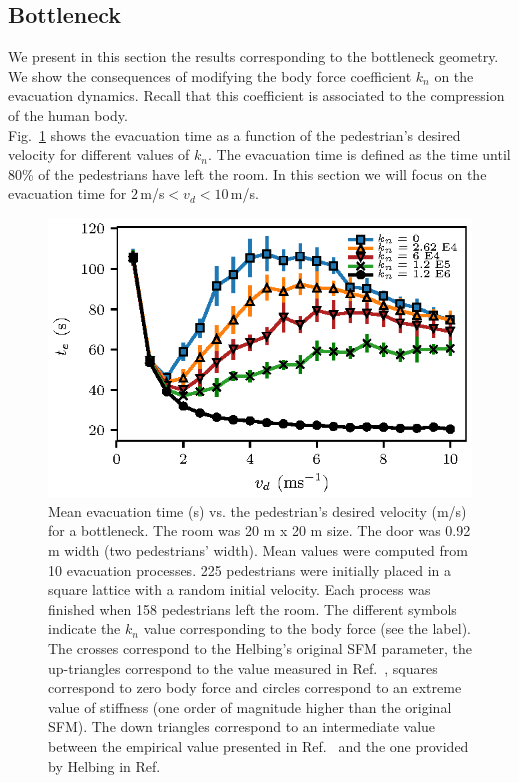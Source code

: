 \documentclass[preprint,12pt]{elsarticle}
\begin{document}
\subsection{\label{bottleneck} Bottleneck}


We present in this section the results corresponding to the bottleneck geometry. 
We show the consequences of modifying the body force coefficient $k_n$ on the 
evacuation dynamics. Recall that this coefficient is associated 
to the compression of the human body. \\

Fig.~\ref{vd_vs_te} shows the evacuation time as a function of the pedestrian's 
desired velocity for different values of $k_n$. The evacuation 
time is defined as the time until 80\% of the pedestrians have 
left the room. In this section we will focus on the evacuation time for 
$2\,$m/s$<v_d<10\,$m/s.\\


\begin{figure}[htbp!]
\centering
\includegraphics[width=0.7\columnwidth]
{./vd_vs_te_N225.eps}
\caption{\label{vd_vs_te}Mean evacuation time (s) vs. the pedestrian’s desired  
velocity (m/s) for a bottleneck. The room was 20 m x 20 m size. The door was 
0.92 m width (two pedestrians' width). Mean values were computed from 10 evacuation processes. 225 
pedestrians were initially placed in a square lattice with a random initial 
velocity. Each process was finished when 158 pedestrians left the room. The 
different symbols indicate the $k_n$ value corresponding to the body force (see 
the label). The crosses correspond to the Helbing's original SFM parameter, the 
up-triangles correspond to the value measured in 
Ref.~\cite{melvin1988aatd}, squares correspond 
to zero body force and circles correspond to an extreme value of stiffness (one 
order of magnitude higher than the original SFM). The 
 down triangles correspond to an intermediate value between the empirical value 
presented in Ref.~\cite{melvin1988aatd} and the one provided by Helbing in 
Ref.~\cite{helbing_2000} }
\end{figure}
\end{document}
